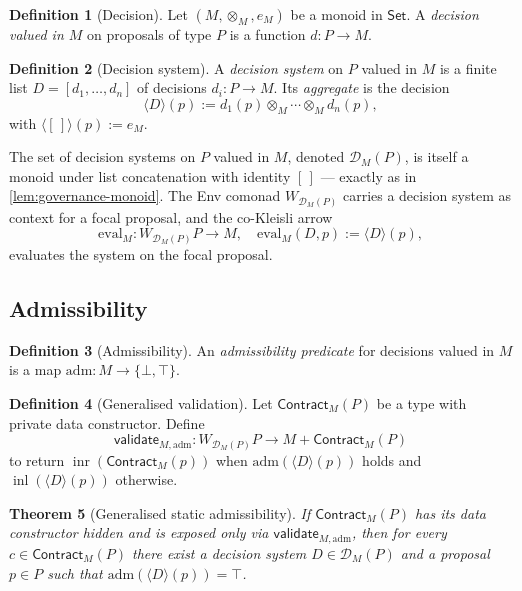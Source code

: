 \documentclass[journal,10pt]{IEEEtran}
\theoremstyle{plain}
\newtheorem{theorem}{Theorem}
\theoremstyle{definition}
\newtheorem{definition}[theorem]{Definition}
\theoremstyle{remark}
\newcommand{\Set}{\mathsf{Set}}
\DeclareMathOperator{\inl}{inl}
\DeclareMathOperator{\inr}{inr}
\newcommand{\Contract}{\mathsf{Contract}}
\newcommand{\Validate}{\mathsf{validate}}
\begin{document}
\begin{definition}[Decision]\label{def:decision}
Let $(M, \otimes_M, e_M)$ be a monoid in $\Set$. A
\emph{decision valued in $M$} on proposals of type $P$ is a
function $d \colon P \to M$.
\end{definition}

\begin{definition}[Decision system]\label{def:decision-system}
A \emph{decision system} on $P$ valued in $M$ is a finite list
$D = [d_1, \ldots, d_n]$ of decisions $d_i \colon P \to M$. Its
\emph{aggregate} is the decision
\[
\langle D \rangle(p) := d_1(p) \otimes_M \cdots \otimes_M d_n(p),
\]
with $\langle [\,] \rangle(p) := e_M$.
\end{definition}

The set of decision systems on $P$ valued in $M$, denoted
$\mathcal{D}_M(P)$, is itself a monoid under list concatenation
with identity $[\,]$ — exactly as in \cref{lem:governance-monoid}.
The Env comonad $W_{\mathcal{D}_M(P)}$ carries a decision system
as context for a focal proposal, and the co-Kleisli arrow
\[
\mathrm{eval}_M
   \colon W_{\mathcal{D}_M(P)} P \longrightarrow M,
\quad
\mathrm{eval}_M(D, p) := \langle D \rangle(p),
\]
evaluates the system on the focal proposal.

\subsection{Admissibility}

\begin{definition}[Admissibility]\label{def:admissibility}
An \emph{admissibility predicate} for decisions valued in $M$ is a
map $\mathrm{adm} \colon M \to \{\bot, \top\}$.
\end{definition}

\begin{definition}[Generalised validation]\label{def:validate-M}
Let $\Contract_M(P)$ be a type with private data constructor.
Define
\[
\Validate_{M, \mathrm{adm}}
  \colon W_{\mathcal{D}_M(P)} P
  \longrightarrow M + \Contract_M(P)
\]
to return $\inr(\Contract_M(p))$ when
$\mathrm{adm}(\langle D \rangle(p))$ holds and
$\inl(\langle D \rangle(p))$ otherwise.
\end{definition}

\begin{theorem}[Generalised static admissibility]\label{thm:static-M}
If $\Contract_M(P)$ has its data constructor hidden and is exposed
only via $\Validate_{M, \mathrm{adm}}$, then for every
$c \in \Contract_M(P)$ there exist a decision system
$D \in \mathcal{D}_M(P)$ and a proposal $p \in P$ such that
$\mathrm{adm}(\langle D \rangle(p)) = \top$.
\end{theorem}
\end{document}
